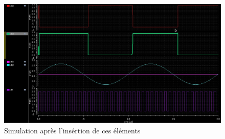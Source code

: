\documentclass[11pt]{article}
\begin{document}
\begin{figure}[!htb]
      \centering
      \includegraphics[width=\linewidth]{sim_comp_after_SR_FF.jpg}
      \caption{Simulation apr\`es l'ins\'ertion de ces \'el\'ements}
      \label{fig:sfigASRFF}
\end{figure}%
\end{document}
